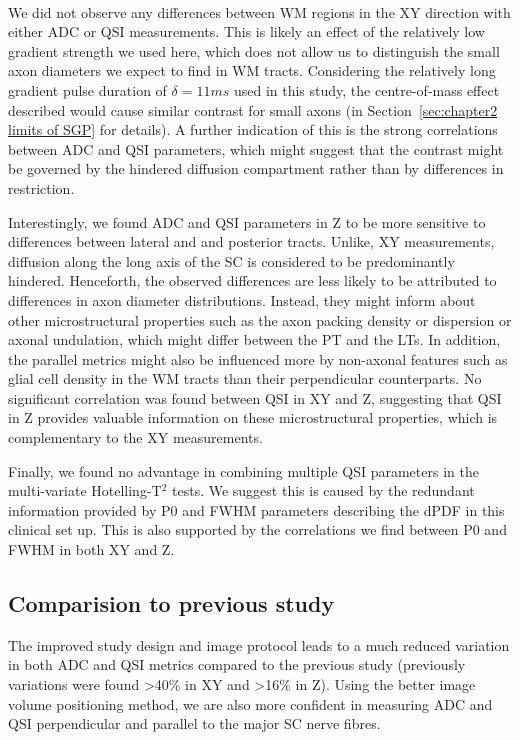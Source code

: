 \paragraph{} We did not observe any differences between WM regions in the XY direction with either ADC or QSI measurements. This is likely an effect of the relatively low gradient strength we used here,  which does not allow us to distinguish the small axon diameters we expect to find in WM tracts. Considering the relatively long gradient pulse duration of $\delta=11ms$ used in this study, the centre-of-mass effect described would cause similar contrast for small axons (in Section~\ref{sec:chapter2 limits of SGP} for details). A further indication of this is the strong correlations between ADC and QSI parameters, which might suggest that the contrast might be governed by the hindered diffusion compartment rather than by differences in restriction.

Interestingly, we found ADC and QSI parameters in Z to be more sensitive to differences between lateral and and posterior tracts. Unlike, XY measurements, diffusion along the long axis of the SC is considered to be predominantly hindered. Henceforth, the observed differences are less likely to be attributed to differences in axon diameter distributions. Instead, they might inform about other microstructural properties such as the axon packing density or dispersion\citep{Zhang:2012} or axonal undulation\citep{Nilsson:2012}, which might differ between the PT and the LTs. In addition, the parallel metrics might also be influenced more by non-axonal features such as glial cell density in the WM tracts than their perpendicular counterparts. No significant correlation was found between QSI in XY and Z, suggesting that QSI in Z provides valuable information on these microstructural properties, which is complementary to the XY measurements.

Finally, we found no advantage in combining multiple QSI parameters in the multi-variate Hotelling-T$^2$ tests. We suggest this is caused by the redundant information provided by P0 and FWHM parameters describing the \gls{dPDF} in this clinical set up. This is also supported by the correlations we find between P0 and FWHM in both XY and Z.

\subsection{Comparision to previous study}
The improved study design and image protocol leads to a much reduced variation in both ADC and QSI metrics compared to the previous study (previously variations were found >40\% in XY and >16\% in Z). Using the better image volume positioning method, we are also more confident in measuring ADC and QSI perpendicular and parallel to the major \gls{SC} nerve fibres.

